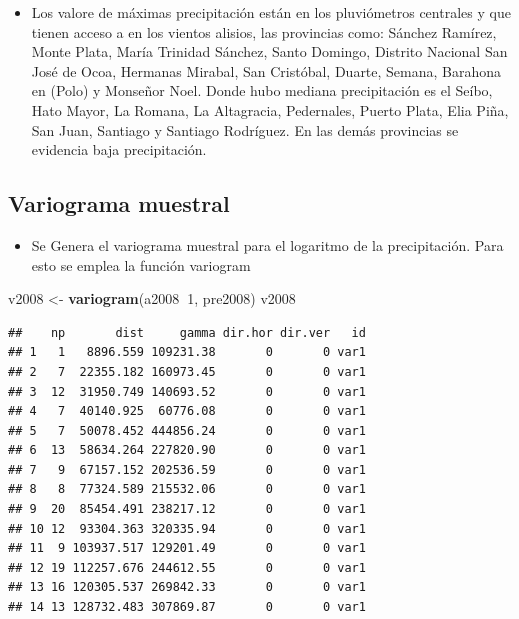 \documentclass[11pt,]{article}
\newenvironment{Shaded}{\begin{snugshade}}{\end{snugshade}}
\newcommand{\KeywordTok}[1]{\textcolor[rgb]{0.13,0.29,0.53}{\textbf{#1}}}
\newcommand{\DecValTok}[1]{\textcolor[rgb]{0.00,0.00,0.81}{#1}}
\newcommand{\StringTok}[1]{\textcolor[rgb]{0.31,0.60,0.02}{#1}}
\newcommand{\OperatorTok}[1]{\textcolor[rgb]{0.81,0.36,0.00}{\textbf{#1}}}
\newcommand{\NormalTok}[1]{#1}
\providecommand{\tightlist}{%
\setlength{\itemsep}{0pt}\setlength{\parskip}{0pt}}
\begin{document}
\begin{itemize}
\tightlist
\item
  Los valore de máximas precipitación están en los pluviómetros
  centrales y que tienen acceso a en los vientos alisios, las provincias
  como: Sánchez Ramírez, Monte Plata, María Trinidad Sánchez, Santo
  Domingo, Distrito Nacional San José de Ocoa, Hermanas Mirabal, San
  Cristóbal, Duarte, Semana, Barahona en (Polo) y Monseñor Noel. Donde
  hubo mediana precipitación es el Seíbo, Hato Mayor, La Romana, La
  Altagracia, Pedernales, Puerto Plata, Elia Piña, San Juan, Santiago y
  Santiago Rodríguez. En las demás provincias se evidencia baja
  precipitación.
\end{itemize}

\subsection{Variograma muestral}\label{variograma-muestral-1}

\begin{itemize}
\tightlist
\item
  Se Genera el variograma muestral para el logaritmo de la
  precipitación. Para esto se emplea la función variogram
\end{itemize}

\begin{Shaded}
\begin{Highlighting}[]
\NormalTok{v2008 <-}\StringTok{ }\KeywordTok{variogram}\NormalTok{(a2008}\OperatorTok{~}\DecValTok{1}\NormalTok{, pre2008)}
\NormalTok{v2008}
\end{Highlighting}
\end{Shaded}

\begin{verbatim}
##    np       dist     gamma dir.hor dir.ver   id
## 1   1   8896.559 109231.38       0       0 var1
## 2   7  22355.182 160973.45       0       0 var1
## 3  12  31950.749 140693.52       0       0 var1
## 4   7  40140.925  60776.08       0       0 var1
## 5   7  50078.452 444856.24       0       0 var1
## 6  13  58634.264 227820.90       0       0 var1
## 7   9  67157.152 202536.59       0       0 var1
## 8   8  77324.589 215532.06       0       0 var1
## 9  20  85454.491 238217.12       0       0 var1
## 10 12  93304.363 320335.94       0       0 var1
## 11  9 103937.517 129201.49       0       0 var1
## 12 19 112257.676 244612.55       0       0 var1
## 13 16 120305.537 269842.33       0       0 var1
## 14 13 128732.483 307869.87       0       0 var1
\end{verbatim}
\end{document}
